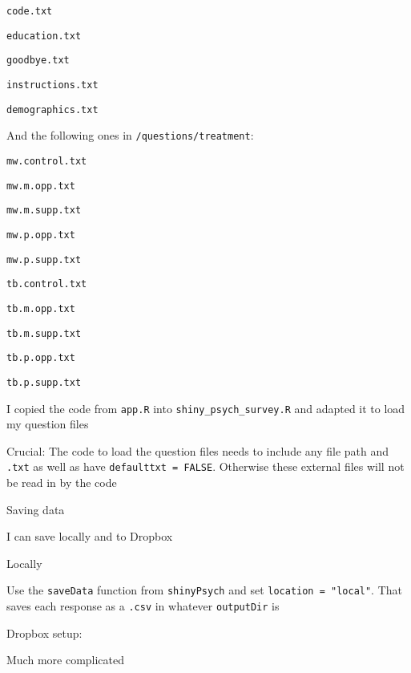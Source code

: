 \documentclass[12pt]{article}
\begin{document}
\begin{coi}
\begin{coi}
					\begin{coi}
						\item {\tt code.txt}
						\item {\tt education.txt}
						\item {\tt goodbye.txt}
						\item {\tt instructions.txt}
						\item {\tt demographics.txt}
					\end{coi}
					And the following ones in {\tt /questions/treatment}:
					\begin{coi}
						\item {\tt mw.control.txt}
						\item {\tt mw.m.opp.txt}
						\item {\tt mw.m.supp.txt}
						\item {\tt mw.p.opp.txt}
						\item {\tt mw.p.supp.txt}
						\item {\tt tb.control.txt}
						\item {\tt tb.m.opp.txt}
						\item {\tt tb.m.supp.txt}
						\item {\tt tb.p.opp.txt}
						\item {\tt tb.p.supp.txt}			
					\end{coi}
				\item I copied the code from {\tt app.R} into {\tt shiny\_psych\_survey.R} and adapted it to load my question files
				\item Crucial: The code to load the question files needs to include any file path and {\tt .txt} as well as have {\tt defaulttxt = FALSE}. Otherwise these external files will not be read in by the code
			\end{coi}
		\item Saving data 
			\begin{coi}
				\item I can save locally and to Dropbox
				\item Locally
					\begin{coi}
						\item Use the {\tt saveData} function from {\tt shinyPsych} and set {\tt location = "local"}. That saves each response as a {\tt .csv} in whatever {\tt outputDir} is
					\end{coi}
				\item Dropbox setup:
					\begin{coi}
						\item Much more complicated

\end{coi}
\end{coi}
\end{coi}
\end{document}
